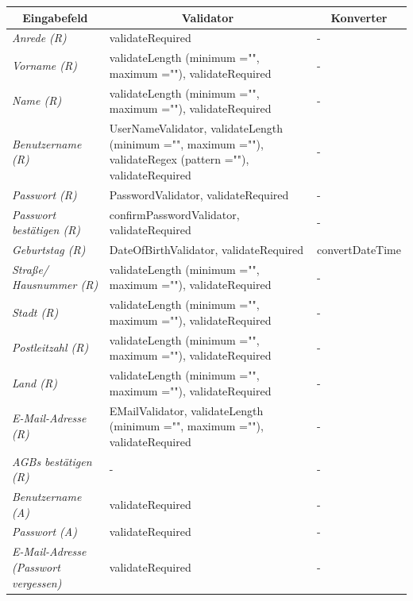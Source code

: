 \begin{itemize}
\begin{itemize}
\begin{center}
\begin{longtable}{|p{3cm} |p{8cm} | p{5cm}|}
						\hline \multicolumn{1}{|c|}{\textbf{Eingabefeld}} & \multicolumn{1}{|c|}{\textbf{Validator}} & \multicolumn{1}{|c|}{\textbf{Konverter}} \\ \hline
						\endfirsthead
						\hline
						\endlastfoot
						\textit{Anrede (R)} & validateRequired & -  \\ \hline
						\textit{Vorname (R)} & validateLength (minimum ="", maximum =""), validateRequired & - \\ \hline
						\textit{Name (R)} & validateLength (minimum ="", maximum =""), validateRequired & -  \\ \hline
						\textit{Benutzername (R)} & UserNameValidator, validateLength (minimum ="", maximum =""), validateRegex (pattern =""), validateRequired  & - \\ \hline
						\textit{Passwort (R)} & PasswordValidator, validateRequired & -  \\ \hline
						\textit{Passwort bestätigen (R)} & confirmPasswordValidator, validateRequired & - \\ \hline
						\textit{Geburtstag (R)} & DateOfBirthValidator, validateRequired & convertDateTime  \\ \hline
						\textit{Straße/ Hausnummer (R)} & validateLength (minimum ="", maximum =""), validateRequired & - \\ \hline
						\textit{Stadt (R)} & validateLength (minimum ="", maximum =""), validateRequired & -  \\ \hline
						\textit{Postleitzahl (R)} & validateLength (minimum ="", maximum =""), validateRequired & - \\ \hline
						\textit{Land (R)} & validateLength (minimum ="", maximum =""), validateRequired & -  \\ \hline
						\textit{E-Mail-Adresse (R)} & EMailValidator, validateLength (minimum ="", maximum =""), validateRequired & - \\ \hline
						\textit{AGBs bestätigen (R)} & - & -  \\ \hline
						\textit{Benutzername (A)} & validateRequired & - \\ \hline
						\textit{Passwort (A)} & validateRequired & -  \\ \hline
						\textit{E-Mail-Adresse (Passwort vergessen)} & validateRequired & - \\ \hline
					\end{longtable}
				\end{center}
				

\end{itemize}
\end{itemize}
